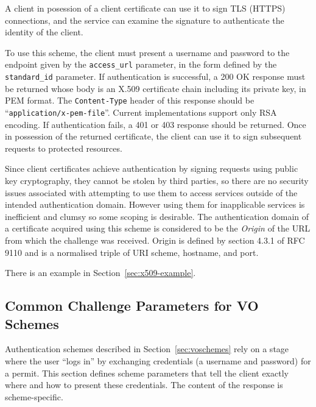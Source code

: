 \documentclass[11pt,a4paper]{ivoa}
\newcommand{\rfc}[1]{RFC\,#1}
\newcommand{\header}[1]{{\tt #1}}
\begin{document}
A client in posession of a client certificate can use it to
sign TLS (HTTPS) connections, and the service can examine the signature
to authenticate the identity of the client.

To use this scheme, the client must present a username and password
to the endpoint given by the \verb|access_url| parameter,
in the form defined by the \verb|standard_id| parameter.
If authentication is successful, a 200 OK response must be returned
whose body is an X.509 certificate chain including its private key,
in PEM format.  The \header{Content-Type} header of this response
should be ``{\tt application/x-pem-file}''. 
Current implementations support only RSA encoding.
If authentication fails, a 401 or 403 response should be returned.
Once in possession of the returned certificate,
the client can use it to sign subsequent requests to protected resources.

Since client certificates achieve authentication by signing requests
using public key cryptography, they cannot be stolen by third parties,
so there are no security issues associated with attempting to use them
to access services outside of the intended authentication domain.
However using them for inapplicable services is inefficient and clumsy
so some scoping is desirable.
The authentication domain of a certificate acquired using this scheme is
considered to be the {\em Origin\/} of the URL from which
the challenge was received.
Origin is defined by section 4.3.1 of \rfc{9110}
and is a normalised triple of URI scheme, hostname, and port.


There is an example in Section~\ref{sec:x509-example}.


\subsection{Common Challenge Parameters for VO Schemes}
\label{sec:common-params}

Authentication schemes described in Section~\ref{sec:voschemes}
rely on a stage where the user ``logs in'' by exchanging
credentials (a username and password) for a permit.
This section defines scheme parameters that
tell the client exactly where and how to present these credentials.
The content of the response is scheme-specific.
\end{document}
